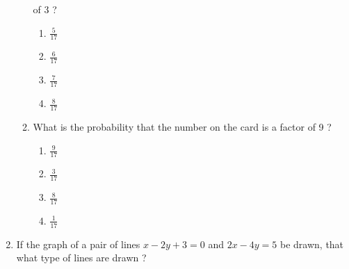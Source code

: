 \documentclass{article}
\begin{document}
\begin{enumerate}
\begin{enumerate}
				of 3 ? 
				\begin{enumerate}
					\item $ \frac{5}{17} $
					\item $ \frac{6}{17} $
					\item $ \frac{7}{17} $
					\item $ \frac{8}{17} $
				\end{enumerate}
			\item What is the probability that the number on the card is a factor of 9 ?
				\begin{enumerate}
					\item $ \frac{9}{17} $
					\item $ \frac{3}{17} $
					\item $ \frac{8}{17} $
					\item $ \frac{1}{17} $
				\end{enumerate}
		\end{enumerate}
	\item If the graph of a pair of lines $ x - 2y + 3 = 0 $ and $ 2x - 4y = 5 $ be drawn, that what type of 
		lines are drawn ? 
\end{enumerate}
\end{document}
